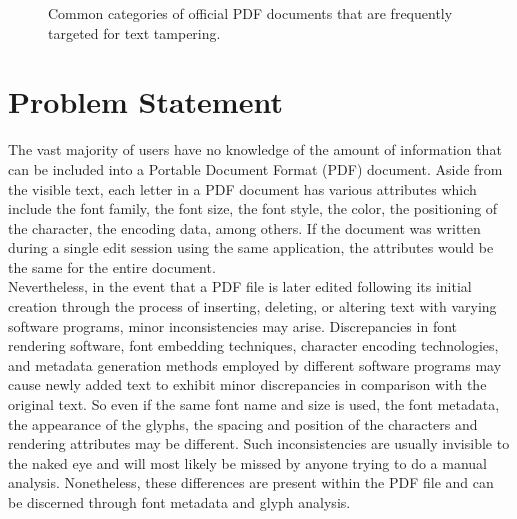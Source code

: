 \begin{figure}[H]
    \centering
    \caption{Common categories of official PDF documents that are frequently targeted for text tampering.}
    \label{fig:doc_types_at_risk}
\end{figure}

\section{Problem Statement}

The vast majority of users have no knowledge of the amount of information that can be included into a Portable Document Format (PDF) document. Aside from the visible text, each letter in a PDF document has various attributes which include the font family, the font size, the font style, the color, the positioning of the character, the encoding data, among others. If the document was written during a single edit session using the same application, the attributes would be the same for the entire document. \\

\noindent Nevertheless, in the event that a PDF file is later edited following its initial creation through the process of inserting, deleting, or altering text with varying software programs, minor inconsistencies may arise. Discrepancies in font rendering software, font embedding techniques, character encoding technologies, and metadata generation methods employed by different software programs may cause newly added text to exhibit minor discrepancies in comparison with the original text. So even if the same font name and size is used, the font metadata, the appearance of the glyphs, the spacing and position of the characters and rendering attributes may be different. Such inconsistencies are usually invisible to the naked eye and will most likely be missed by anyone trying to do a manual analysis. Nonetheless, these differences are present within the PDF file and can be discerned through font metadata and glyph analysis.\\

